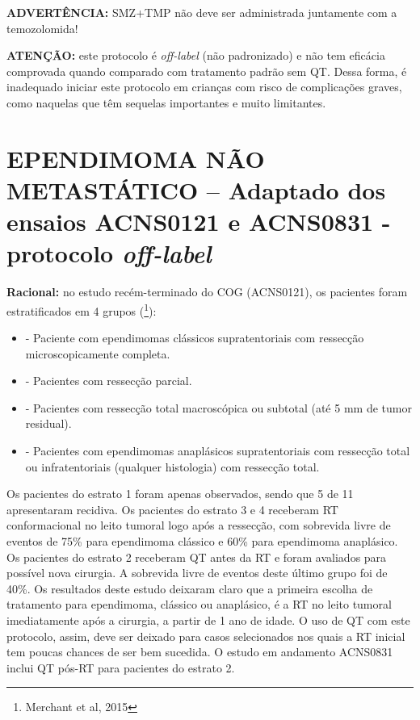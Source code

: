 \documentclass[11pt,a4paper,oldfontcommands]{memoir}
\begin{document}
\textbf{ADVERTÊNCIA:} SMZ+TMP não deve ser administrada juntamente com a temozolomida!

\textbf{ATENÇÃO:} este protocolo é \textit{off-label} (não padronizado) e não tem eficácia comprovada quando comparado com tratamento padrão sem QT. Dessa forma, é inadequado iniciar este protocolo em crianças com risco de complicações graves, como naquelas que têm sequelas importantes e muito limitantes.\\
\cleardoublepage

\section{EPENDIMOMA NÃO METASTÁTICO -- Adaptado dos ensaios ACNS0121 e ACNS0831 - protocolo \textit{off-label}}
{\let\thefootnote\relax{}}

\textbf{Racional:} no estudo recém-terminado do COG (ACNS0121), os pacientes foram estratificados em 4 grupos (\footnote{Merchant et al, 2015}):
\begin{itemize}
\item[Estrato 1] - Paciente com ependimomas clássicos supratentoriais com ressecção microscopicamente completa.
\item[Estrato 2] - Pacientes com ressecção parcial.
\item[Estrato 3] - Pacientes com ressecção total macroscópica ou subtotal (até 5 mm de tumor residual).
\item[Estrato 4] - Pacientes com ependimomas anaplásicos supratentoriais com ressecção total ou infratentoriais (qualquer histologia) com ressecção total.
\end{itemize}

Os pacientes do estrato 1 foram apenas observados, sendo que 5 de 11 apresentaram recidiva. Os pacientes do estrato 3 e 4 receberam RT conformacional no leito tumoral logo após a ressecção, com sobrevida livre de eventos de 75\% para ependimoma clássico e 60\% para ependimoma anaplásico. Os pacientes do estrato 2 receberam QT antes da RT e foram avaliados para possível nova cirurgia. A sobrevida livre de eventos deste último grupo foi de 40\%. Os resultados deste estudo deixaram claro que a primeira escolha de tratamento para ependimoma, clássico ou anaplásico, é a RT no leito tumoral imediatamente após a cirurgia, a partir de 1 ano de idade. O uso de QT com este protocolo, assim, deve ser deixado para casos selecionados nos quais a RT inicial tem poucas chances de ser bem sucedida. O estudo em andamento ACNS0831 inclui QT pós-RT para pacientes do estrato 2.
\end{document}
